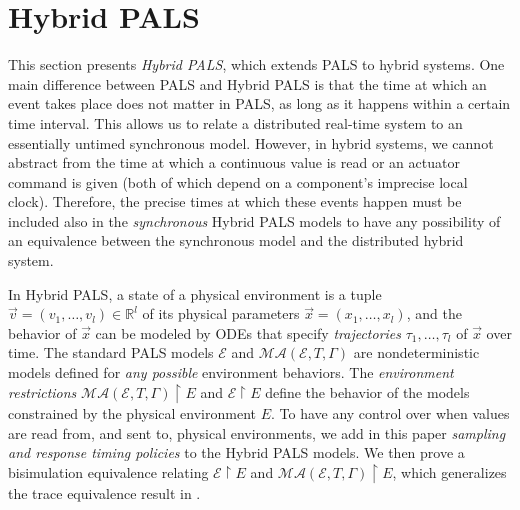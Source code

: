 
\section{Hybrid PALS}
\label{sec:hybrid-pals}



This section presents \emph{Hybrid PALS}, which extends PALS to hybrid
systems.  One main difference between PALS and Hybrid PALS is that
 the time at which an event takes place does not matter in PALS, as
long as it happens within a certain time interval. This
 allows us to relate a distributed
real-time system to an essentially untimed synchronous model. However,
in hybrid systems, we cannot abstract from the time at which a
continuous value is read or  an actuator command is given
(both of which depend on a component's imprecise local clock). Therefore,
the precise times at which these events happen must be included also
in the \emph{synchronous} Hybrid PALS models to have any possibility
of an equivalence between the synchronous model and the distributed
hybrid system. 


In Hybrid PALS, a  state of a physical environment %
is 
a tuple $\vec{v} = (v_1,\ldots,v_l) \in \mathbb{R}^l$ 
of its physical parameters $\vec{x} = (x_1, \ldots,x_l)$,
and
the behavior of %
$\vec{x}$
can be modeled by ODEs that specify \emph{trajectories} 
$\tau_1, \ldots, \tau_l$ of %
$\vec{x}$ over time.
%
The standard PALS models $\mathcal{E}$ and $\mathcal{MA}(\mathcal{E},T,\Gamma)$ 
are  nondeterministic models defined for \emph{any possible} environment behaviors.
The \emph{environment restrictions} 
$\mathcal{MA}(\mathcal{E},T,\Gamma)\restriction E$
and
$\mathcal{E} \restriction E$
 define the behavior of the models 
 constrained by the physical  environment $E$.  To have any
 control over when values are read from, and sent to, physical environments, we add in this paper \emph{sampling and
   response timing policies} to the Hybrid PALS models. 
We then  
prove a bisimulation equivalence 
relating $\mathcal{E}\restriction E$ and $\mathcal{MA}(\mathcal{E}, T,\Gamma)\restriction E$,
which generalizes the  trace equivalence result in \cite{hybrid-pals}.




